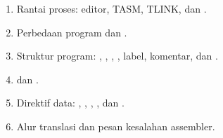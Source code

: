 \documentclass[../../main.tex]{subfiles}
\begin{document}
\begin{materibox}
\vspace{1.1em}
\begin{enumerate}
    \item Rantai proses: editor, TASM, TLINK, dan .
    \item Perbedaan program  dan .
    \item Struktur program: , , ,
          , label, komentar, dan .
    \item {} dan .
    \item Direktif data: , , , ,
          dan .
    \item Alur translasi dan pesan kesalahan assembler.
\end{enumerate}
\end{materibox}










\end{document}

